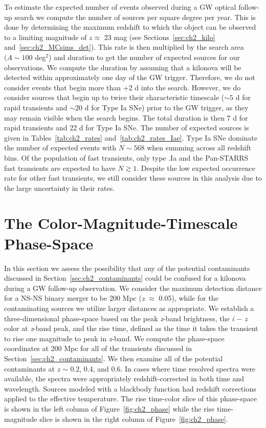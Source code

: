 To estimate the expected number of events observed during a GW optical follow-up search we compute the number of sources per square degree per year. This is done by determining the maximum redshift to which the object can be observed to a limiting magnitude of $z \approx$ 23 mag (see Sections~\ref{sec:ch2_kilo} and~\ref{sec:ch2_MCsims_det}). This rate is then multiplied by the search area $(A \sim 100$ deg$^2$) and duration to get the number of expected sources for our observations. We compute the duration by assuming that a kilonova will be detected within approximately one day of the GW trigger. Therefore, we do not consider events that begin more than +2 d into the search. However, we do consider sources that begin up to twice their characteristic timescale ($\sim5$ d for rapid transients and $\sim 20$ d for Type Ia SNe) prior to the GW trigger, as they may remain visible when the search begins. The total duration is then 7 d for rapid transients and 22 d for Type Ia SNe. The number of expected sources is given in Tables~\ref{tab:ch2_rates} and~\ref{tab:ch2_rates_Iae}. Type Ia SNe dominate the number of expected events with $N \sim 568$ when summing across all redshift bins. Of the population of fast transients, only type .Ia and the Pan-STARRS fast transients are expected to have $N \gtrsim 1$. Despite the low expected occurrence rate for other fast transients, we still consider these sources in this analysis due to the large uncertainty in their rates.

\section{The Color-Magnitude-Timescale Phase-Space}
\label{sec:ch2_phase}
In this section we assess the possibility that any of the potential contaminants discussed in Section~\ref{sec:ch2_contaminants} could be confused  for a kilonova during a GW follow-up observation. We consider the maximum detection distance for a NS-NS binary merger to be 200 Mpc ({\em z} $\approx$ 0.05), while for the contaminating sources we utilize larger distances as appropriate. We establish a three-dimensional phase-space based on the peak {\em z}-band brightness, the {\em i} $-$ {\em z} color at {\em z}-band peak, and the rise time, defined as the time it takes the transient to rise one magnitude to peak in {\em z}-band. We compute the phase-space coordinates at 200 Mpc for all of the transients discussed in Section~\ref{sec:ch2_contaminants}. We then examine all of the potential contaminants at {\em z} $\sim$ 0.2, 0.4, and 0.6. In cases where time resolved spectra were available, the spectra were appropriately redshift-corrected in both time and wavelength. Sources modeled with a blackbody function had redshift corrections applied to the effective temperature. The rise time-color slice of this phase-space is shown in the left column of Figure~\ref{fig:ch2_phase} while the rise time-magnitude slice is shown in the right column of Figure~\ref{fig:ch2_phase}.

